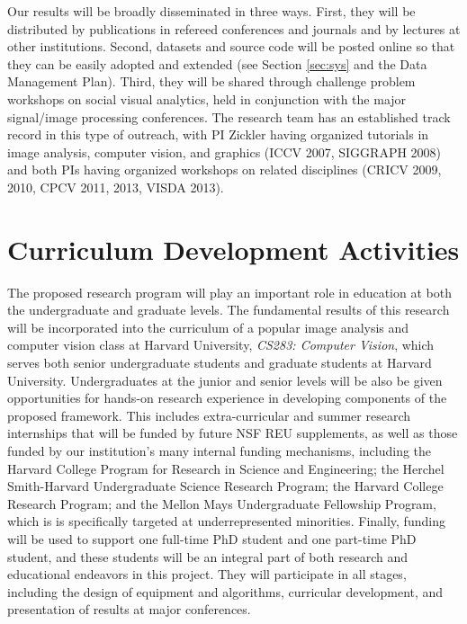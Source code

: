 Our results will be broadly disseminated in three ways. First, they will be distributed by publications in refereed conferences and journals and by lectures at other institutions. Second, datasets and source code will be posted online so that they can be easily adopted and extended (see Section \ref{sec:sys} and the Data Management Plan). Third, they will be shared through challenge problem workshops on social visual analytics, held in conjunction with the major signal/image processing conferences. The research team has an established track record in this type of outreach, with PI Zickler having organized tutorials in image analysis, computer vision, and graphics (ICCV 2007, SIGGRAPH 2008) and both PIs having organized workshops on related disciplines (CRICV 2009, 2010, CPCV 2011, 2013, VISDA 2013).

\vspace{-8pt}
\section{Curriculum Development Activities}
\label{sec:curriculum}
\vspace{-8pt}
The proposed research program will play an important role in education at both the undergraduate and graduate levels. The fundamental results of this research will be incorporated into the curriculum of a popular image analysis and computer vision class at Harvard University, \emph{CS283: Computer Vision}, which serves both senior undergraduate students and graduate students at Harvard University. Undergraduates at the junior and senior levels will be also be given opportunities for hands-on research experience in developing components of the proposed framework. This includes extra-curricular and summer research internships that will be funded by future NSF REU supplements, as well as those funded by our institution's many internal funding mechanisms, including the Harvard College Program for Research in Science and Engineering; the Herchel Smith-Harvard Undergraduate Science Research Program; the Harvard College Research Program; and the Mellon Mays Undergraduate Fellowship Program, which is is specifically targeted at underrepresented minorities. Finally, funding will be used to support one full-time PhD student and one part-time PhD student, and these students will be an integral part of both research and educational endeavors in this project. They will participate in all stages, including the design of equipment and algorithms, curricular development, and presentation of results at major conferences.

